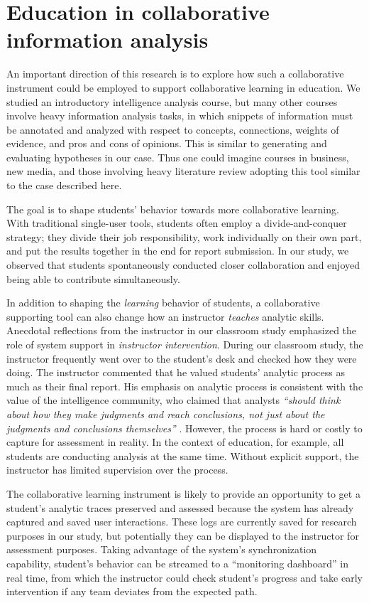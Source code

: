 \section{Education in collaborative information analysis}

An important direction of this research is to explore how such a collaborative instrument could be employed to support collaborative learning in education. We studied an introductory intelligence analysis course, but many other courses involve heavy information analysis tasks, in which snippets of information must be annotated and analyzed with respect to concepts, connections, weights of evidence, and pros and cons of opinions. This is similar to generating and evaluating hypotheses in our case. Thus one could imagine courses in business, new media, and those involving heavy literature review adopting this tool similar to the case described here.

The goal is to shape students' behavior towards more collaborative learning. With traditional single-user tools, students often employ a divide-and-conquer strategy; they divide their job responsibility, work individually on their own part, and put the results together in the end for report submission. In our study, we observed that students spontaneously conducted closer collaboration and enjoyed being able to contribute simultaneously.

In addition to shaping the \textit{learning} behavior of students, a collaborative supporting tool can also change how an instructor \textit{teaches} analytic skills. Anecdotal reflections from the instructor in our classroom study emphasized the role of system support in \textit{instructor intervention}. During our classroom study, the instructor frequently went over to the student's desk and checked how they were doing. The instructor commented that he valued students' analytic process as much as their final report. His emphasis on analytic process is consistent with the value of the intelligence community, who claimed that analysts \textit{``should think about how they make judgments and reach conclusions, not just about the judgments and conclusions themselves''} \citep{Heuer1999}. However, the process is hard or costly to capture for assessment in reality. In the context of education, for example, all students are conducting analysis at the same time. Without explicit support, the instructor has limited supervision over the process.

The collaborative learning instrument is likely to provide an opportunity to get a student's analytic traces preserved and assessed because the system has already captured and saved user interactions. These logs are currently saved for research purposes in our study, but potentially they can be displayed to the instructor for assessment purposes. Taking advantage of the system's synchronization capability, student's behavior can be streamed to a ``monitoring dashboard'' in real time, from which the instructor could check student's progress and take early intervention if any team deviates from the expected path.